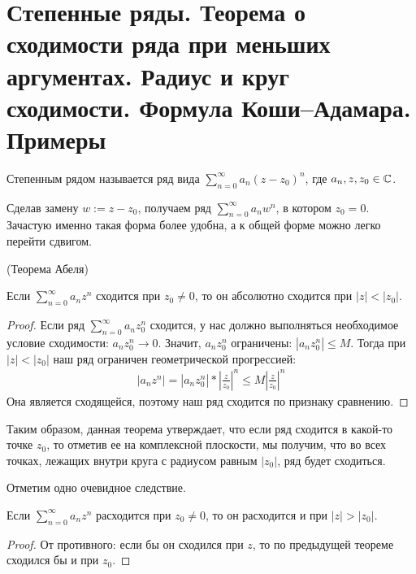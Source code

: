 \section{Степенные ряды. Теорема о сходимости ряда при меньших аргументах. Радиус и круг сходимости. Формула Коши–Адамара. Примеры}
\begin{conj}
    Степенным рядом называется ряд вида $\sum\limits_{n=0}^\infty a_n(z - z_0)^n$, где $a_n, z, z_0 \in \mathbb{C}$.
\end{conj}
\begin{notice}
    Сделав замену $w := z - z_0$, получаем ряд $\sum\limits_{n=0}^\infty a_n w^n$, в котором $z_0 = 0$. 
    Зачастую именно такая форма более удобна, а к общей форме можно легко перейти сдвигом.
\end{notice}

\vspace*{5mm}

\begin{theorem} (Теорема Абеля)

    Если $\sum\limits_{n=0}^\infty a_n z^n$ сходится при $z_0 \neq 0$, то он абсолютно сходится при $|z| < |z_0|$.    
\end{theorem}
\begin{proof}
    Если ряд $\sum\limits_{n=0}^\infty a_n z_0^n$ сходится, у нас должно выполняться необходимое условие сходимости: $a_nz_0^n \to 0$.
    Значит, $a_nz_0^n$ ограничены: $|a_nz_0^n| \leqslant M$. 
    Тогда при $|z| < |z_0|$ наш ряд ограничен геометрической прогрессией:
    \begin{gather*}
        |a_nz^n| = |a_nz_0^n| * |\frac{z}{z_0}|^n \leqslant M|\frac{z}{z_0}|^n
    \end{gather*}
    Она является сходящейся, поэтому наш ряд сходится по признаку сравнению.
\end{proof}

Таким образом, данная теорема утверждает, что если ряд сходится в какой-то точке $z_0$, то отметив ее на комплексной плоскости, мы получим, что во всех точках, лежащих внутри круга с радиусом равным $|z_0|$, ряд будет сходиться.

Отметим одно очевидное следствие.

\begin{follow}
    Если $\sum\limits_{n=0}^\infty a_n z^n$ расходится при $z_0 \neq 0$, то он расходится и при $|z| > |z_0|$.
\end{follow}
\begin{proof}
    От противного: если бы он сходился при $z$, то по предыдущей теореме сходился бы и при $z_0$.
\end{proof}

